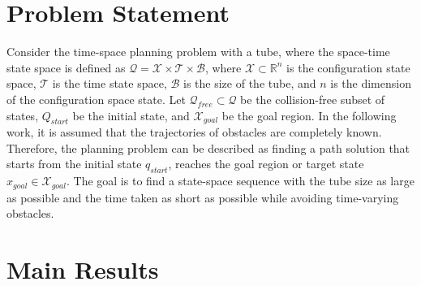 \documentclass[conference]{IEEEtran}
\begin{document}
    \section{Problem Statement}
    \label{sec2}
    Consider the time-space planning problem with a tube, where the space-time state space is defined as \(\mathcal{Q} = \mathcal{X} \times \mathcal{T} \times \mathcal{B}\), where \(\mathcal{X} \subset \mathbb{R}^n\) is the configuration state space, \(\mathcal{T}\) is the time state space, \(\mathcal{B}\) is the size of the tube, and \(n\) is the dimension of the configuration space state. Let \(\mathcal{Q}_{free} \subset \mathcal{Q}\) be the collision-free subset of states, \(Q_{start}\) be the initial state, and \(\mathcal{X}_{goal}\) be the goal region. In the following work, it is assumed that the trajectories of obstacles are completely known. Therefore, the planning problem can be described as finding a path solution that starts from the initial state \(q_{start}\), reaches the goal region or target state \(x_{goal} \in \mathcal{X}_{goal}\). The goal is to find a state-space sequence with the tube size as large as possible and the time taken as short as possible while avoiding time-varying obstacles.


    \section{Main Results}
    \label{sec3}
\end{document}
